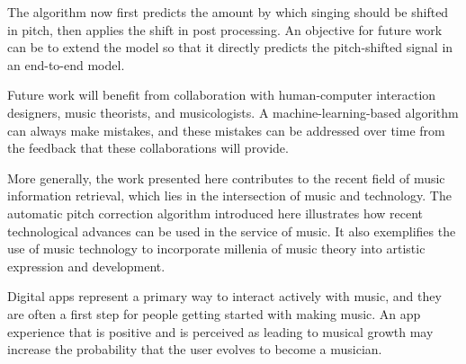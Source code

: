 The algorithm now first predicts the amount by which singing should be shifted in pitch, then applies the shift in post processing. An objective for future work can be to extend the model so that it directly predicts the pitch-shifted signal in an end-to-end model. 

Future work will benefit from collaboration with human-computer interaction designers, music theorists, and musicologists. A machine-learning-based algorithm can always make mistakes, and these mistakes can be addressed over time from the feedback that these collaborations will provide.

More generally, the work presented here contributes to the recent field of music information retrieval, which lies in the intersection of music and technology. The automatic pitch correction algorithm introduced here illustrates how recent technological advances can be used in the service of music. It also exemplifies the use of music technology to incorporate millenia of music theory into artistic expression and development.

Digital apps represent a primary way to interact actively with music, and they are often a first step for people getting started with making music. An app experience that is positive and is perceived as leading to musical growth may increase the probability that the user evolves to become a musician.
